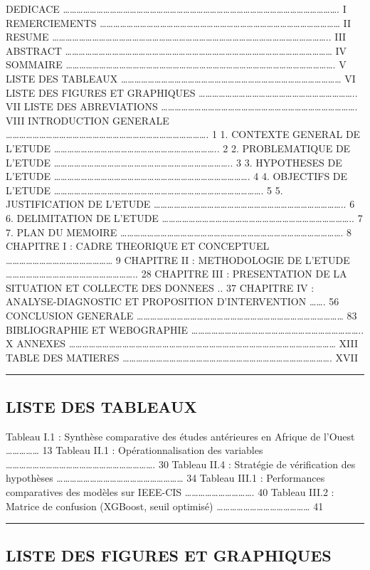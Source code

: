 \documentclass[
  12pt,
]{article}
\begin{document}
DEDICACE ……………………………………………………………………………………………………………. I REMERCIEMENTS
……………………………………………………………………………………………… II RESUME
…………………………………………………………………………………………………………….. III ABSTRACT
………………………………………………………………………………………………………… IV SOMMAIRE
…………………………………………………………………………………………………………. V LISTE DES TABLEAUX
……………………………………………………………………………………… VI LISTE DES FIGURES ET GRAPHIQUES
…………………………………………………………….. VII LISTE DES ABREVIATIONS
……………………………………………………………………………. VIII INTRODUCTION GENERALE
………………………………………………………………………………. 1 1. CONTEXTE GENERAL DE L’ETUDE
……………………………………………………………….. 2 2. PROBLEMATIQUE DE L’ETUDE
…………………………………………………………………….. 3 3. HYPOTHESES DE L’ETUDE
……………………………………………………………………………. 4 4. OBJECTIFS DE L’ETUDE
…………………………………………………………………………………. 5 5. JUSTIFICATION DE L’ETUDE
………………………………………………………………………….. 6 6. DELIMITATION DE L’ETUDE
………………………………………………………………………….. 7 7. PLAN DU MEMOIRE
………………………………………………………………………………………. 8 CHAPITRE I : CADRE THEORIQUE ET
CONCEPTUEL ………………………………………… 9 CHAPITRE II : METHODOLOGIE DE L’ETUDE
………………………………………………….. 28 CHAPITRE III : PRESENTATION DE LA SITUATION ET
COLLECTE DES DONNEES .. 37 CHAPITRE IV : ANALYSE-DIAGNOSTIC ET
PROPOSITION D’INTERVENTION ……. 56 CONCLUSION GENERALE
………………………………………………………………………………… 83 BIBLIOGRAPHIE ET WEBOGRAPHIE
………………………………………………………………….. X ANNEXES
………………………………………………………………………………………………………… XIII TABLE DES MATIERES
…………………………………………………………………………………. XVII

\begin{center}\rule{0.5\linewidth}{0.5pt}\end{center}

\subsection{LISTE DES TABLEAUX}\label{liste-des-tableaux}

Tableau I.1 : Synthèse comparative des études antérieures en Afrique de
l’Ouest …………… 13 Tableau II.1 : Opérationnalisation des variables
…………………………………………………………. 30 Tableau II.4 : Stratégie de vérification des
hypothèses ………………………………………………… 34 Tableau III.1 : Performances
comparatives des modèles sur IEEE-CIS …………………………. 40 Tableau III.2 :
Matrice de confusion (XGBoost, seuil optimisé) …………………………………… 41

\begin{center}\rule{0.5\linewidth}{0.5pt}\end{center}

\subsection{LISTE DES FIGURES ET
GRAPHIQUES}\label{liste-des-figures-et-graphiques}
\end{document}
